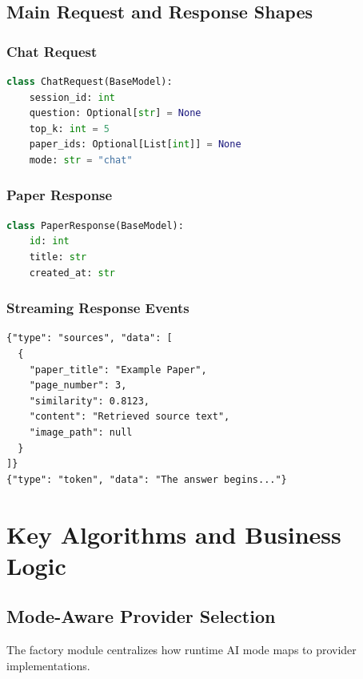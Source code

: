 \documentclass[11pt,a4paper]{report}
\begin{document}
\section{Main Request and Response Shapes}

\subsection{Chat Request}

\begin{lstlisting}[language=Python, caption={ChatRequest model}]
class ChatRequest(BaseModel):
    session_id: int
    question: Optional[str] = None
    top_k: int = 5
    paper_ids: Optional[List[int]] = None
    mode: str = "chat"
\end{lstlisting}

\subsection{Paper Response}

\begin{lstlisting}[language=Python, caption={PaperResponse model}]
class PaperResponse(BaseModel):
    id: int
    title: str
    created_at: str
\end{lstlisting}

\subsection{Streaming Response Events}

\begin{lstlisting}[caption={NDJSON streaming payloads}]
{"type": "sources", "data": [
  {
    "paper_title": "Example Paper",
    "page_number": 3,
    "similarity": 0.8123,
    "content": "Retrieved source text",
    "image_path": null
  }
]}
{"type": "token", "data": "The answer begins..."}
\end{lstlisting}

\newpage
\chapter{Key Algorithms and Business Logic}

\section{Mode-Aware Provider Selection}

The factory module centralizes how runtime AI mode maps to provider implementations.
\end{document}
